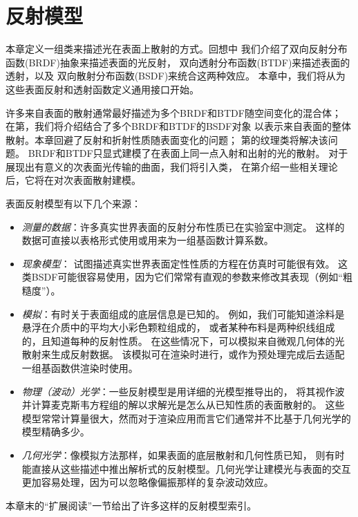 \chapter{反射模型}\label{chap:反射模型}
\setcounter{sidenote}{1}
本章定义一组类来描述光在表面上散射的方式。回想中
我们介绍了双向反射分布函数(BRDF)抽象来描述表面的光反射，
双向透射分布函数(BTDF)来描述表面的透射，以及
双向散射分布函数(BSDF)来统合这两种效应。
本章中，我们将从为这些表面反射和透射函数定义通用接口开始。

许多来自表面的散射通常最好描述为多个BRDF和BTDF随空间变化的混合体；
在第，我们将介绍结合了多个BRDF和BTDF的BSDF对象
以表示来自表面的整体散射。本章回避了反射和折射性质随表面变化的问题；
第的纹理类将解决该问题。
BRDF和BTDF只显式建模了在表面上同一点入射和出射的光的散射。
对于展现出有意义的次表面光传输的曲面，我们将引入类，
在第介绍一些相关理论后，它将在对次表面散射建模。

表面反射模型有以下几个来源：
\begin{itemize}
      \item \emph{测量的数据}：许多真实世界表面的反射分布性质已在实验室中测定。
            这样的数据可直接以表格形式使用或用来为一组基函数计算系数。
      \item \emph{现象模型}：
            试图描述真实世界表面定性性质的方程在仿真时可能很有效。
            这类BSDF可能很容易使用，因为它们常常有直观的参数来修改其表现（例如“粗糙度”）。
      \item \emph{模拟}：有时关于表面组成的底层信息是已知的。
            例如，我们可能知道涂料是悬浮在介质中的平均大小彩色颗粒组成的，
            或者某种布料是两种织线组成的，且知道每种的反射性质。
            在这些情况下，可以模拟来自微观几何体的光散射来生成反射数据。
            该模拟可在渲染时进行，或作为预处理完成后去适配一组基函数供渲染时使用。
      \item \emph{物理（波动）光学}：一些反射模型是用详细的光模型推导出的，
            将其视作波并计算麦克斯韦方程组的解以求解光是怎么从已知性质的表面散射的。
            这些模型常常计算量很大，然而对于渲染应用而言它们通常并不比基于几何光学的模型精确多少。
      \item \emph{几何光学}：像模拟方法那样，如果表面的底层散射和几何性质已知，
            则有时能直接从这些描述中推出解析式的反射模型。几何光学让建模光与表面的交互
            更加容易处理，因为可以忽略像偏振那样的复杂波动效应。
\end{itemize}
本章末的“扩展阅读”一节给出了许多这样的反射模型索引。

